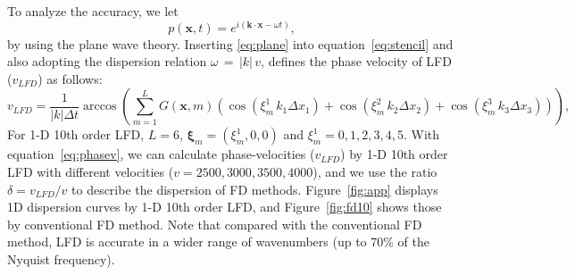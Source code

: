To analyze the accuracy, we let
\begin{equation}
  \label{eq:plane}
  p(\mathbf{x},t) = e^{i(\mathbf{k}\cdot\mathbf{x}-\omega t)}, 
\end{equation}
by using the plane wave theory.
Inserting \ref{eq:plane} into equation~\ref{eq:stencil} and also adopting the dispersion relation $\omega\,=\,|k|\,v$, 
defines the phase velocity of LFD ($v_{LFD}$) as follows:
\begin{equation}
  \label{eq:phasev}
  v_{LFD}=\frac{1}{|k|\Delta t} \arccos(\sum\limits_{m=1}^L G(\mathbf{x},m) (\cos(\xi_m^1\,k_1\Delta x_1)+\cos(\xi_m^2\,k_2\Delta x_2)+\cos(\xi_m^3\,k_3\Delta x_3))) , 
\end{equation}
For 1-D 10th order LFD, $L=6$, $\mathbf{\xi}_m=(\xi_m^1,0,0)$ and $\xi_m^1={0,1,2,3,4,5}$.
With equation~\ref{eq:phasev}, 
we can calculate phase-velocities ($v_{LFD}$) by 1-D 10th order LFD with different velocities ($v=2500,3000,3500,4000$),
and we use the ratio $\delta=v_{LFD}/v$ to describe the dispersion of FD methods.
Figure~\ref{fig:app} displays 1D dispersion curves by 1-D 10th order LFD,     
and Figure~\ref{fig:fd10} shows those by conventional FD method. 
Note that compared with the conventional FD method, LFD is accurate in
a wider range of wavenumbers (up to 70\% of the Nyquist frequency). 



